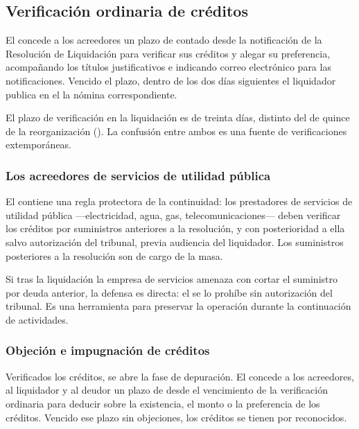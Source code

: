 \subsection{Verificación ordinaria de créditos}

El  concede a los acreedores un plazo de  contado desde la
notificación de la Resolución de Liquidación para verificar sus créditos y alegar su
preferencia, acompañando los títulos justificativos e indicando correo electrónico para las
notificaciones. Vencido el plazo, dentro de los dos días siguientes el liquidador publica en
el \boletin{} la nómina correspondiente.

\begin{alerta}
El plazo de verificación en la liquidación es de treinta días, distinto del de quince de la
reorganización (). La confusión entre ambos es una fuente de verificaciones
extemporáneas.
\end{alerta}

\subsubsection{Los acreedores de servicios de utilidad pública}

El  contiene una regla protectora de la continuidad: los prestadores de servicios de
utilidad pública ---electricidad, agua, gas, telecomunicaciones--- deben verificar los créditos
por suministros anteriores a la resolución, y  con
posterioridad a ella salvo autorización del tribunal, previa audiencia del liquidador. Los
suministros posteriores a la resolución son de cargo de la masa.

\begin{practica}
Si tras la liquidación la empresa de servicios amenaza con cortar el suministro por deuda
anterior, la defensa es directa: el  se lo prohíbe sin autorización del tribunal. Es
una herramienta para preservar la operación durante la continuación de actividades.
\end{practica}

\subsubsection{Objeción e impugnación de créditos}

Verificados los créditos, se abre la fase de depuración. El  concede a los acreedores,
al liquidador y al deudor un plazo de  desde el vencimiento de la
verificación ordinaria para deducir  sobre la existencia, el monto o
la preferencia de los créditos. Vencido ese plazo sin objeciones, los créditos se tienen por
reconocidos.

